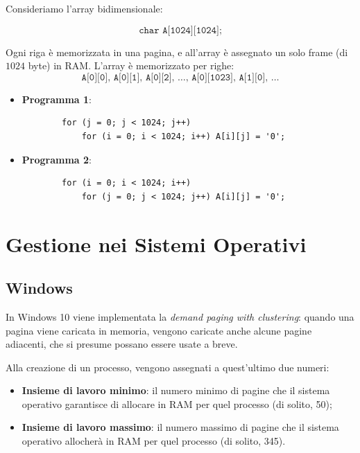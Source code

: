 Consideriamo l'array bidimensionale:

\[
\texttt{char A[1024][1024];}
\]

Ogni riga è memorizzata in una pagina, e all'array è assegnato un solo frame (di $1024$ byte) in RAM. L’array è memorizzato per righe:
\[
\texttt{A[0][0], A[0][1], A[0][2], \ldots, A[0][1023], A[1][0], \ldots}
\]

\begin{itemize}
    \item \textbf{Programma 1}: 
    \begin{verbatim}
        for (j = 0; j < 1024; j++)
            for (i = 0; i < 1024; i++) A[i][j] = '0';
    \end{verbatim}
    
    \item \textbf{Programma 2}:
    \begin{verbatim}
        for (i = 0; i < 1024; i++)
            for (j = 0; j < 1024; j++) A[i][j] = '0';
    \end{verbatim}
\end{itemize}



\section{Gestione nei Sistemi Operativi}
\subsection{Windows}
In Windows 10 viene implementata la \textit{demand paging with clustering}: quando una pagina viene caricata in memoria, vengono caricate anche alcune pagine adiacenti, che si presume possano essere usate a breve.

Alla creazione di un processo, vengono assegnati a quest'ultimo due numeri:
\begin{itemize}
    \item \textbf{Insieme di lavoro minimo}: il numero minimo di pagine che il sistema operativo garantisce di allocare in RAM per quel processo (di solito, 50);
    \item \textbf{Insieme di lavoro massimo}: il numero massimo di pagine che il sistema operativo allocherà in RAM per quel processo (di solito, 345).
\end{itemize}


